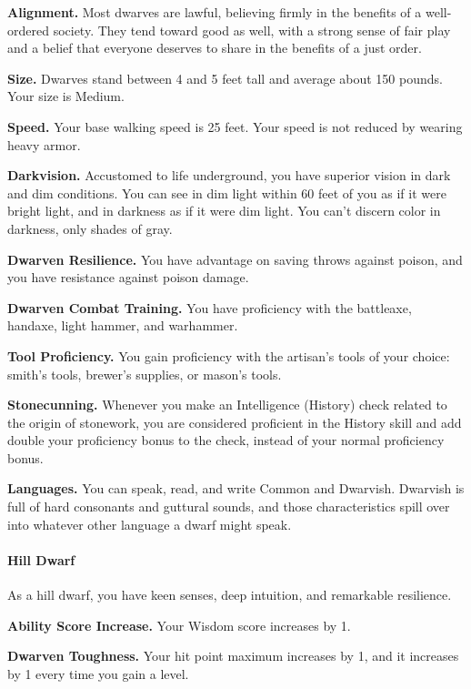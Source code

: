 \documentclass[
]{article}
\begin{document}
\textbf{Alignment.} Most dwarves are lawful, believing firmly in the
benefits of a well-ordered society. They tend toward good as well, with
a strong sense of fair play and a belief that everyone deserves to share
in the benefits of a just order.

\textbf{Size.} Dwarves stand between 4 and 5 feet tall and average about
150 pounds. Your size is Medium.

\textbf{Speed.} Your base walking speed is 25 feet. Your speed is not
reduced by wearing heavy armor.

\textbf{Darkvision.} Accustomed to life underground, you have superior
vision in dark and dim conditions. You can see in dim light within 60
feet of you as if it were bright light, and in darkness as if it were
dim light. You can't discern color in darkness, only shades of gray.

\textbf{Dwarven Resilience.} You have advantage on saving throws against
poison, and you have resistance against poison damage.

\textbf{Dwarven Combat Training.} You have proficiency with the
battleaxe, handaxe, light hammer, and warhammer.

\textbf{Tool Proficiency.} You gain proficiency with the artisan's tools
of your choice: smith's tools, brewer's supplies, or mason's tools.

\textbf{Stonecunning.} Whenever you make an Intelligence (History) check
related to the origin of stonework, you are considered proficient in the
History skill and add double your proficiency bonus to the check,
instead of your normal proficiency bonus.

\textbf{Languages.} You can speak, read, and write Common and Dwarvish.
Dwarvish is full of hard consonants and guttural sounds, and those
characteristics spill over into whatever other language a dwarf might
speak.

\hypertarget{hill-dwarf}{%
\paragraph{Hill Dwarf}\label{hill-dwarf}}

As a hill dwarf, you have keen senses, deep intuition, and remarkable
resilience.

\textbf{Ability Score Increase.} Your Wisdom score increases by 1.

\textbf{Dwarven Toughness.} Your hit point maximum increases by 1, and
it increases by 1 every time you gain a level.
\end{document}
